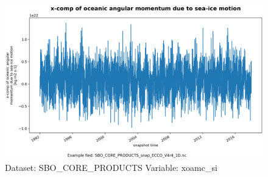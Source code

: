 \begin{figure}[H]
\centering
\includegraphics[width=\textwidth]{../images/plots/oneD_plots/SBO_Core_Products/xoamc_si.png}
\caption{Dataset: SBO\_CORE\_PRODUCTS Variable: xoamc\_si}
\label{tab:table-SBO_CORE_PRODUCTS_xoamc_si-Plot}
\end{figure}
\pagebreak
